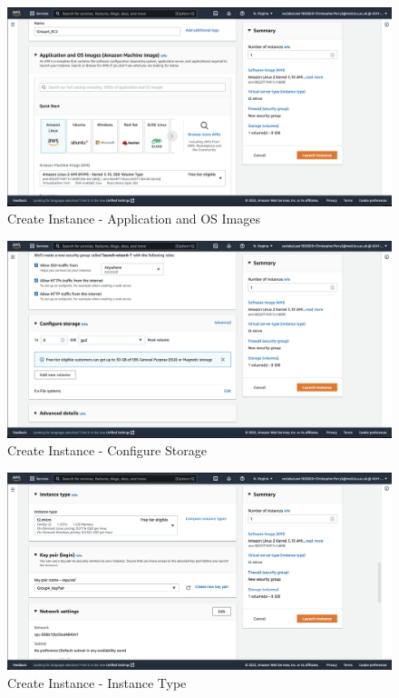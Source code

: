 \begin{figure}[H]
    \centering
        \includegraphics[width=\textwidth]{resources/ec2/create-instance-application-and-os-images}
    \caption{Create Instance - Application and OS Images}
    \label{fig:create-instance-application-and-os-images}
\end{figure}

\begin{figure}[H]
    \centering
        \includegraphics[width=\textwidth]{resources/ec2/create-instance-configure-storage}
    \caption{Create Instance - Configure Storage}
    \label{fig:create-instance-configure-storage}
\end{figure}

\begin{figure}[H]
    \centering
        \includegraphics[width=\textwidth]{resources/ec2/create-instance-instance-type}
    \caption{Create Instance - Instance Type}
    \label{fig:create-instance-instance-type}
\end{figure}


